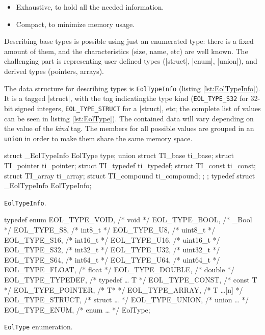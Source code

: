 \begin{itemize}
  \item Exhaustive, to hold all the needed information.
  \item Compact, to minimize memory usage.
\end{itemize}

Describing base types is possible using just an enumerated type: there is
a fixed amount of them, and the characteristics (size, name, etc) are well
known. The challenging part is representing user defined types (\Mc|struct|,
\Mc|enum|, \Mc|union|), and derived types (pointers, arrays).

The data structure for describing types is \verb|EolTypeInfo| (listing
\vref{lst:EolTypeInfo}). It is a tagged \Mc|struct|, with the tag
indicatingthe type kind (\verb|EOL_TYPE_S32| for 32-bit signed integers,
\verb|EOL_TYPE_STRUCT| for a \Mc|struct|, etc; the complete list of values
can be seen in listing \vref{lst:EolType}). The contained data will vary
depending on the value of the \emph{kind} tag. The members for all possible
values are grouped in an \texttt{union} in order to make them share the
same memory space.

\begin{listing}[H]
  \begin{ccode}
    struct _EolTypeInfo {
      EolType type;
      union {
        struct TI_base     ti_base;
        struct TI_pointer  ti_pointer;
        struct TI_typedef  ti_typedef;
        struct TI_const    ti_const;
        struct TI_array    ti_array;
        struct TI_compound ti_compound;
      };
    };
    typedef struct _EolTypeInfo EolTypeInfo;
  \end{ccode}
  \caption{\texttt{EolTypeInfo}.}
  \label{lst:EolTypeInfo}
\end{listing}

\begin{listing}[tH]
  \centering
  \begin{ccode}
    typedef enum {
      EOL_TYPE_VOID,    /* void        */
      EOL_TYPE_BOOL,    /* _Bool       */
      EOL_TYPE_S8,      /* int8_t      */
      EOL_TYPE_U8,      /* uint8_t     */
      EOL_TYPE_S16,     /* int16_t     */
      EOL_TYPE_U16,     /* uint16_t    */
      EOL_TYPE_S32,     /* int32_t     */
      EOL_TYPE_U32,     /* uint32_t    */
      EOL_TYPE_S64,     /* int64_t     */
      EOL_TYPE_U64,     /* uint64_t    */
      EOL_TYPE_FLOAT,   /* float       */
      EOL_TYPE_DOUBLE,  /* double      */
      EOL_TYPE_TYPEDEF, /* typedef … T */
      EOL_TYPE_CONST,   /* const T     */
      EOL_TYPE_POINTER, /* T*          */
      EOL_TYPE_ARRAY,   /* T …[n]      */
      EOL_TYPE_STRUCT,  /* struct …    */
      EOL_TYPE_UNION,   /* union …     */
      EOL_TYPE_ENUM,    /* enum …      */
    } EolType;
  \end{ccode}
  \caption{\texttt{EolType} enumeration.}
  \label{lst:EolType}
\end{listing}


